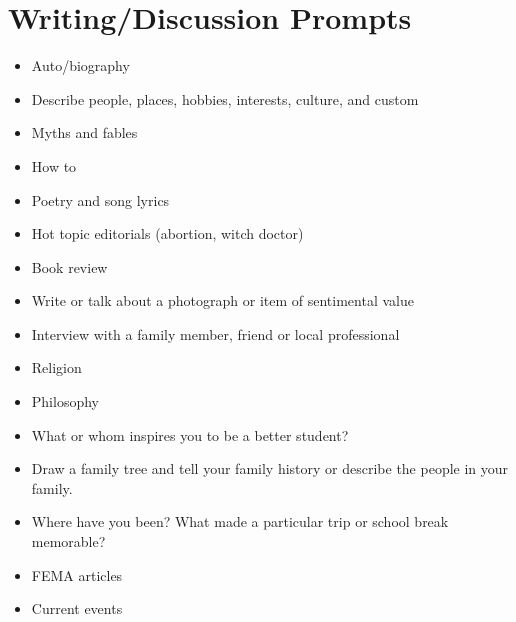 \section{Writing/Discussion Prompts}
\begin{itemize}
\item Auto/biography 
\item Describe people, places, hobbies, interests, culture, and custom 
\item Myths and fables  
\item How to  
\item Poetry and song lyrics  
\item Hot topic editorials (abortion, witch doctor)  
\item Book review  
\item Write or talk about a photograph or item of sentimental value  
\item Interview with a family member, friend or local professional  
\item Religion  
\item Philosophy  
\item What or whom inspires you to be a better student?  
\item Draw a family tree and tell your family history or describe the people
in your family. 
\item Where have you been? What made a particular trip or school break memorable? 
\item FEMA articles  
\item Current events
\end{itemize}


